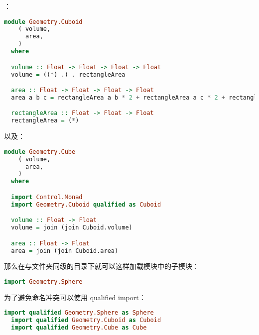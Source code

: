 \documentclass[./main.tex]{subfiles}
\begin{document}
：

\begin{lstlisting}[language=Haskell]
  module Geometry.Cuboid
    ( volume,
      area,
    )
  where

  volume :: Float -> Float -> Float -> Float
  volume = ((*) .) . rectangleArea

  area :: Float -> Float -> Float -> Float
  area a b c = rectangleArea a b * 2 + rectangleArea a c * 2 + rectangleArea c b * 2

  rectangleArea :: Float -> Float -> Float
  rectangleArea = (*)
\end{lstlisting}

以及：

\begin{lstlisting}[language=Haskell]
  module Geometry.Cube
    ( volume,
      area,
    )
  where

  import Control.Monad
  import Geometry.Cuboid qualified as Cuboid

  volume :: Float -> Float
  volume = join (join Cuboid.volume)

  area :: Float -> Float
  area = join (join Cuboid.area)
\end{lstlisting}

那么在与文件夹同级的目录下就可以这样加载模块中的子模块：

\begin{lstlisting}[language=Haskell]
import Geometry.Sphere
\end{lstlisting}

为了避免命名冲突可以使用 qualified import：

\begin{lstlisting}[language=Haskell]
  import qualified Geometry.Sphere as Sphere
  import qualified Geometry.Cuboid as Cuboid
  import qualified Geometry.Cube as Cube
\end{lstlisting}
\end{document}
